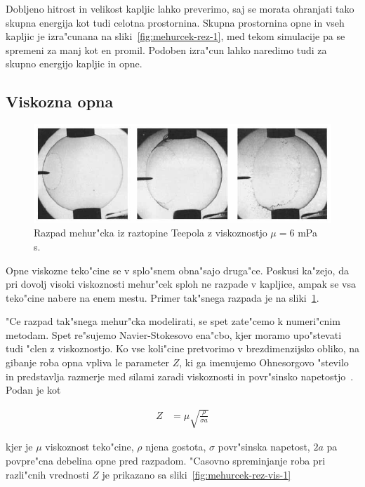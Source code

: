 \documentclass[a4paper,10pt]{article}
\begin{document}
Dobljeno hitrost in velikost kapljic lahko preverimo, saj se morata ohranjati tako skupna energija kot tudi celotna prostornina. Skupna prostornina opne in vseh kapljic je izra"cunana na sliki~\ref{fig:mehurcek-rez-1}, med tekom simulacije pa se spremeni za manj kot en promil. Podoben izra"cun lahko naredimo tudi za skupno energijo kapljic in opne.

\newpage
\subsection{Viskozna opna}
\begin{figure}[h]
  \centering
\includegraphics[width=.9\textwidth]{./Slike/meh-vis-1}
\caption{Razpad mehur"cka iz raztopine Teepola z viskoznostjo $\mu = 6$ mPa s.~\cite{pandit}}
\label{fig:mehurcek-viskozni-razpad}
\end{figure}

Opne viskozne teko"cine se v splo"snem obna"sajo druga"ce. Poskusi ka"zejo, da pri dovolj visoki viskoznosti mehur"cek sploh ne razpade v kapljice, ampak se vsa teko"cine nabere na enem mestu. Primer tak"snega razpada je na sliki~\ref{fig:mehurcek-viskozni-razpad}. 

"Ce razpad tak"snega mehur"cka modelirati, se spet zate"cemo k numeri"cnim metodam. Spet re"sujemo Navier-Stokesovo ena"cbo, kjer moramo upo"stevati tudi "clen z viskoznostjo. Ko vse koli"cine pretvorimo v brezdimenzijsko obliko, na gibanje roba opna vpliva le parameter $Z$, ki ga imenujemo Ohnesorgovo "stevilo in predstavlja razmerje med silami zaradi viskoznosti in povr"sinsko napetostjo~\cite{scat}. Podan je kot

\begin{align}
Z &= \mu\sqrt{\frac{\rho}{\sigma a}} 
\end{align}

kjer je $\mu$ viskoznost teko"cine, $\rho$ njena gostota, $\sigma$ povr"sinska napetost, $2a$ pa povpre"cna debelina opne pred razpadom. "Casovno spreminjanje roba pri razli"cnih vrednosti $Z$ je prikazano sa sliki~\ref{fig:mehurcek-rez-vis-1}
\end{document}
